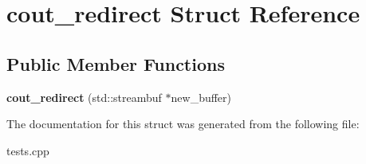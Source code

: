 \hypertarget{structcout__redirect}{}\section{cout\+\_\+redirect Struct Reference}
\label{structcout__redirect}
\subsection*{Public Member Functions}
\begin{DoxyCompactItemize}
\item 
\mbox{\label{structcout__redirect_a1ce2b56b3bf54f8bbd2709828e517946}} 
{\bfseries cout\+\_\+redirect} (std\+::streambuf $\ast$new\+\_\+buffer)
\end{DoxyCompactItemize}


The documentation for this struct was generated from the following file\+:\begin{DoxyCompactItemize}
\item 
tests.\+cpp\end{DoxyCompactItemize}
